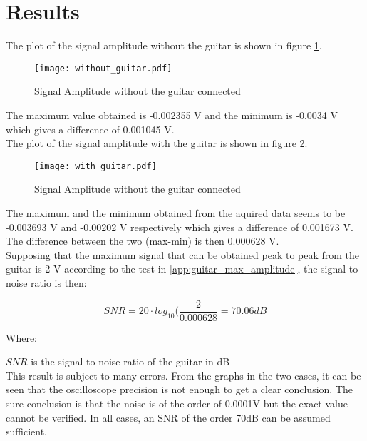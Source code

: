 \section{Results}

The plot of the signal amplitude without the guitar is shown in figure \ref{fig:without_guitar}. \\

\begin{figure}[hbt]
  \centering
  \texttt{[image: without\_guitar.pdf]}
  \caption{Signal Amplitude without the guitar connected}
  \label{fig:without_guitar}
\end{figure}

The maximum value obtained is -0.002355 V and the minimum is -0.0034 V which gives a difference of 0.001045 V. \\

The plot of the signal amplitude with the guitar is shown in figure \ref{fig:with_guitar}. \\

\begin{figure}[hbt]
  \centering
  \texttt{[image: with\_guitar.pdf]}
  \caption{Signal Amplitude without the guitar connected}
  \label{fig:with_guitar}
\end{figure}

The maximum and the minimum obtained from the aquired data seems to be -0.003693 V and -0.00202 V respectively which gives a difference of 0.001673 V.  \\
The difference between the two (max-min) is then 0.000628 V. \\
Supposing that the maximum signal that can be obtained peak to peak from the guitar is 2 V according to the test in \autoref{app:guitar_max_amplitude}, the signal to noise ratio is then:

\begin{equation}
	SNR = 20 \cdot log_{10}(\frac{2}{0.000628} = 70.06dB
	\end{equation}

Where:

$SNR$ is the signal to noise ratio of the guitar in dB \\


This result is subject to many errors. From the graphs in the two cases, it can be seen that the oscilloscope precision is not enough to get a clear conclusion. The sure conclusion is that the noise is of the order of 0.0001V but the exact value cannot be verified. In all cases, an SNR of the order 70dB can be assumed sufficient.